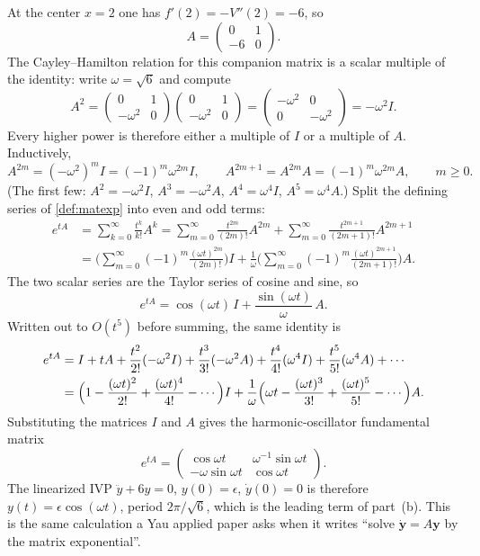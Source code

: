 \documentclass[11pt,a4paper]{article}
\begin{document}
\begin{example}[The linearization at \(x=2\), computed]
\label{ex:expA-center}
At the center \(x=2\) one has \(f'(2)=-V''(2)=-6\), so
\[
A
=
\begin{pmatrix} 0 & 1 \\ -6 & 0 \end{pmatrix}.
\]
The Cayley--Hamilton relation for this companion matrix is a scalar multiple of the identity: write \(\omega=\sqrt{6}\) and compute
\[
A^{2}
=
\begin{pmatrix} 0 & 1 \\ -\omega^{2} & 0 \end{pmatrix}
\begin{pmatrix} 0 & 1 \\ -\omega^{2} & 0 \end{pmatrix}
=
\begin{pmatrix} -\omega^{2} & 0 \\ 0 & -\omega^{2} \end{pmatrix}
=
-\omega^{2} I.
\]
Every higher power is therefore either a multiple of \(I\) or a multiple of \(A\). Inductively,
\[
A^{2m}=(-\omega^{2})^{m}I=(-1)^{m}\omega^{2m}I,
\qquad
A^{2m+1}=A^{2m}A=(-1)^{m}\omega^{2m}A,
\qquad m\ge 0.
\]
(The first few: \(A^{2}=-\omega^{2}I\), \(A^{3}=-\omega^{2}A\), \(A^{4}=\omega^{4}I\), \(A^{5}=\omega^{4}A\).) Split the defining series of \cref{def:matexp} into even and odd terms:
\begin{align*}
e^{tA}
&=
\sum_{k=0}^{\infty}\frac{t^{k}}{k!}A^{k}
=
\sum_{m=0}^{\infty}\frac{t^{2m}}{(2m)!}A^{2m}
+
\sum_{m=0}^{\infty}\frac{t^{2m+1}}{(2m+1)!}A^{2m+1}
\\
&=
\Biggl(\sum_{m=0}^{\infty}(-1)^{m}\frac{(\omega t)^{2m}}{(2m)!}\Biggr)I
+
\frac{1}{\omega}
\Biggl(\sum_{m=0}^{\infty}(-1)^{m}\frac{(\omega t)^{2m+1}}{(2m+1)!}\Biggr)A.
\end{align*}
The two scalar series are the Taylor series of cosine and sine, so
\[
e^{tA}
=
\cos(\omega t)\,I
+
\frac{\sin(\omega t)}{\omega}\,A.
\]
Written out to \(O(t^{5})\) before summing, the same identity is
\begin{align*}
e^{tA}
&=
I+tA+\frac{t^{2}}{2!}(-\omega^{2}I)+\frac{t^{3}}{3!}(-\omega^{2}A)+\frac{t^{4}}{4!}(\omega^{4}I)+\frac{t^{5}}{5!}(\omega^{4}A)+\cdots
\\
&=
\Bigl(1-\frac{(\omega t)^{2}}{2!}+\frac{(\omega t)^{4}}{4!}-\cdots\Bigr)I
+
\frac{1}{\omega}
\Bigl(\omega t-\frac{(\omega t)^{3}}{3!}+\frac{(\omega t)^{5}}{5!}-\cdots\Bigr)A.
\end{align*}
Substituting the matrices \(I\) and \(A\) gives the harmonic-oscillator fundamental matrix
\[
e^{tA}
=
\begin{pmatrix}
\cos\omega t & \omega^{-1}\sin\omega t \\
-\omega\sin\omega t & \cos\omega t
\end{pmatrix}.
\]
The linearized IVP \(\ddot y+6y=0\), \(y(0)=\epsilon\), \(\dot y(0)=0\) is therefore \(y(t)=\epsilon\cos(\omega t)\), period \(2\pi/\sqrt{6}\), which is the leading term of part~(b). This is the same calculation a Yau applied paper asks when it writes ``solve \(\dot{\mathbf{y}}=A\mathbf{y}\) by the matrix exponential''.
\end{example}
\end{document}
